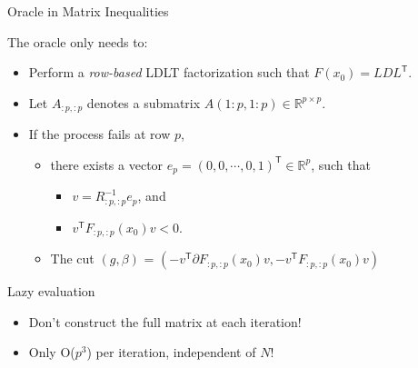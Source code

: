 \documentclass[
  ignorenonframetext,
  aspectratio=169,
  serif,onlymath]{beamer}
\providecommand{\tightlist}{%
  \setlength{\itemsep}{0pt}\setlength{\parskip}{0pt}}
\begin{document}
\begin{frame}{Oracle in Matrix Inequalities}
\protect\hypertarget{oracle-in-matrix-inequalities}{}

The oracle only needs to:

\begin{itemize}
\tightlist
\item
  Perform a \emph{row-based} LDLT factorization such that
  \(F(x_0) = L D L^\mathsf{T}\).
\item
  Let \(A_{:p,:p}\) denotes a submatrix
  \(A(1:p, 1:p) \in \mathbb{R}^{p\times p}\).
\item
  If the process fails at row \(p\),

  \begin{itemize}
  \tightlist
  \item
    there exists a vector
    \(e_p = (0, 0, \cdots, 0, 1)^\mathsf{T} \in \mathbb{R}^p\), such
    that

    \begin{itemize}
    \tightlist
    \item
      \(v = R_{:p,:p}^{-1} e_p\), and
    \item
      \(v^\mathsf{T} F_{:p,:p}(x_0) v < 0\).
    \end{itemize}
  \item
    The cut \((g, \beta)\) =
    \((-v^\mathsf{T} \partial F_{:p,:p}(x_0) v, -v^\mathsf{T} F_{:p,:p}(x_0) v)\)
  \end{itemize}
\end{itemize}

\end{frame}

\begin{frame}{Lazy evaluation}
\protect\hypertarget{lazy-evaluation}{}

\begin{itemize}
\item
  Don't construct the full matrix at each iteration!
\item
  Only O(\(p^3\)) per iteration, independent of \(N\)!
\end{itemize}

\end{frame}
\end{document}
